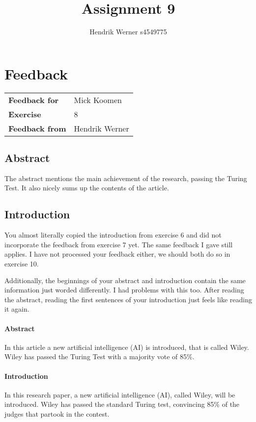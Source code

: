 \documentclass[12pt, a4paper]{article}
\title{Assignment 9}
\author{Hendrik Werner s4549775}
\begin{document}
\maketitle

\clearpage
\section{Feedback}

\begin{tabular}{ll}
	\textbf{Feedback for} & Mick Koomen\\
	\textbf{Exercise} & 8\\
	\textbf{Feedback from} & Hendrik Werner\\
\end{tabular}

\subsection{Abstract}
The abstract mentions the main achievement of the research, passing the Turing Test. It also nicely sums up the contents of the article.

\subsection{Introduction}
You almost literally copied the introduction from exercise 6 and did not incorporate the feedback from exercise 7 yet. The same feedback I gave still applies. I have not processed your feedback either, we should both do so in exercise 10.

Additionally, the beginnings of your abstract and introduction contain the same information just worded differently. I had problems with this too. After reading the abstract, reading the first sentences of your introduction just feels like reading it again.

\begin{multicols}{2}
	\paragraph{Abstract} In this article a new artificial intelligence (AI) is introduced, that is called Wiley. Wiley has passed the Turing Test with a majority vote of 85\%.

	\paragraph{Introduction} In this research paper, a new artificial intelligence (AI), called Wiley, will be
introduced. Wiley has passed the standard Turing test, convincing 85\% of the
judges that partook in the contest.
\end{multicols}
\end{document}

